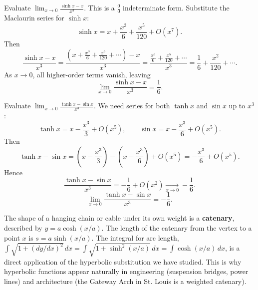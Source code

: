 \documentclass[11pt]{article}
\begin{document}
\begin{exoresolu}
Evaluate $\displaystyle \lim_{x\to 0} \frac{\sinh x - x}{x^3}$.
\tcblower
This is a $\frac{0}{0}$ indeterminate form. Substitute the Maclaurin series for $\sinh x$:
\[
\sinh x = x + \frac{x^3}{6} + \frac{x^5}{120} + O(x^7).
\]
Then
\[
\frac{\sinh x - x}{x^3} = \frac{\left(x + \frac{x^3}{6} + \frac{x^5}{120} + \cdots\right) - x}{x^3} = \frac{\frac{x^3}{6} + \frac{x^5}{120} + \cdots}{x^3} = \frac{1}{6} + \frac{x^2}{120} + \cdots.
\]
As $x \to 0$, all higher-order terms vanish, leaving
\[
\boxed{\lim_{x\to 0} \frac{\sinh x - x}{x^3} = \frac{1}{6}}.
\]
\end{exoresolu}

\begin{exoresolu}
Evaluate $\displaystyle \lim_{x\to 0} \frac{\tanh x - \sin x}{x^3}$.
\tcblower
We need series for both $\tanh x$ and $\sin x$ up to $x^3$:
\[
\tanh x = x - \frac{x^3}{3} + O(x^5), \qquad \sin x = x - \frac{x^3}{6} + O(x^5).
\]
Then
\[
\tanh x - \sin x = \left(x - \frac{x^3}{3}\right) - \left(x - \frac{x^3}{6}\right) + O(x^5) = -\frac{x^3}{6} + O(x^5).
\]
Hence
\[
\frac{\tanh x - \sin x}{x^3} = -\frac{1}{6} + O(x^2) \xrightarrow[x\to 0]{} -\frac{1}{6}.
\]
\[
\boxed{\lim_{x\to 0} \frac{\tanh x - \sin x}{x^3} = -\frac{1}{6}}.
\]
\end{exoresolu}

\begin{savaistu}
The shape of a hanging chain or cable under its own weight is a \textbf{catenary}, described by $y = a\cosh(x/a)$. The length of the catenary from the vertex to a point $x$ is $s = a\sinh(x/a)$. The integral for arc length, $\int \sqrt{1 + (dy/dx)^2}\,dx = \int \sqrt{1 + \sinh^2(x/a)}\,dx = \int \cosh(x/a)\,dx$, is a direct application of the hyperbolic substitution we have studied. This is why hyperbolic functions appear naturally in engineering (suspension bridges, power lines) and architecture (the Gateway Arch in St. Louis is a weighted catenary).
\end{savaistu}
\end{document}
